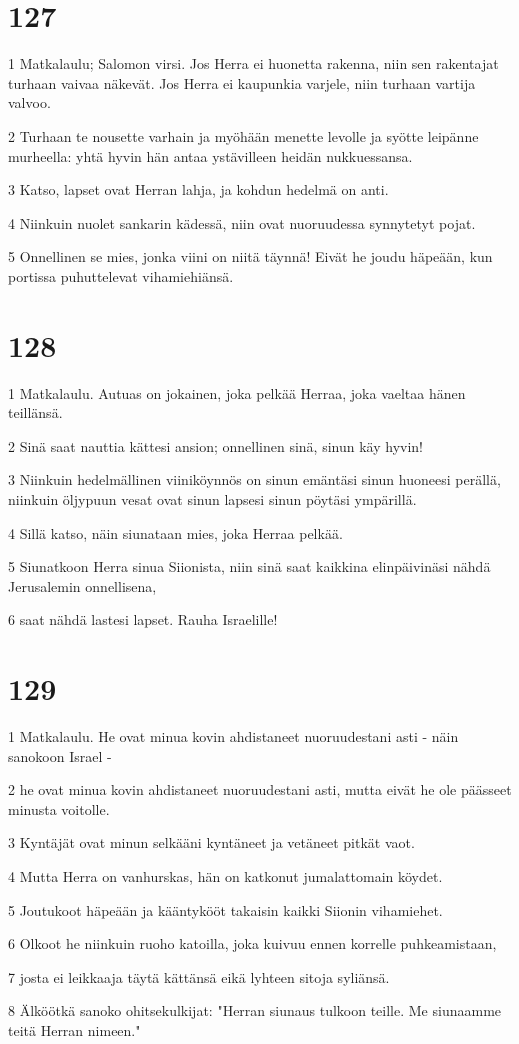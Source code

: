 \chapter{127}

\par 1 Matkalaulu; Salomon virsi. Jos Herra ei huonetta rakenna, niin sen rakentajat turhaan vaivaa näkevät. Jos Herra ei kaupunkia varjele, niin turhaan vartija valvoo.
\par 2 Turhaan te nousette varhain ja myöhään menette levolle ja syötte leipänne murheella: yhtä hyvin hän antaa ystävilleen heidän nukkuessansa.
\par 3 Katso, lapset ovat Herran lahja, ja kohdun hedelmä on anti.
\par 4 Niinkuin nuolet sankarin kädessä, niin ovat nuoruudessa synnytetyt pojat.
\par 5 Onnellinen se mies, jonka viini on niitä täynnä! Eivät he joudu häpeään, kun portissa puhuttelevat vihamiehiänsä.

\chapter{128}

\par 1 Matkalaulu. Autuas on jokainen, joka pelkää Herraa, joka vaeltaa hänen teillänsä.
\par 2 Sinä saat nauttia kättesi ansion; onnellinen sinä, sinun käy hyvin!
\par 3 Niinkuin hedelmällinen viiniköynnös on sinun emäntäsi sinun huoneesi perällä, niinkuin öljypuun vesat ovat sinun lapsesi sinun pöytäsi ympärillä.
\par 4 Sillä katso, näin siunataan mies, joka Herraa pelkää.
\par 5 Siunatkoon Herra sinua Siionista, niin sinä saat kaikkina elinpäivinäsi nähdä Jerusalemin onnellisena,
\par 6 saat nähdä lastesi lapset. Rauha Israelille!

\chapter{129}

\par 1 Matkalaulu. He ovat minua kovin ahdistaneet nuoruudestani asti - näin sanokoon Israel -
\par 2 he ovat minua kovin ahdistaneet nuoruudestani asti, mutta eivät he ole päässeet minusta voitolle.
\par 3 Kyntäjät ovat minun selkääni kyntäneet ja vetäneet pitkät vaot.
\par 4 Mutta Herra on vanhurskas, hän on katkonut jumalattomain köydet.
\par 5 Joutukoot häpeään ja kääntykööt takaisin kaikki Siionin vihamiehet.
\par 6 Olkoot he niinkuin ruoho katoilla, joka kuivuu ennen korrelle puhkeamistaan,
\par 7 josta ei leikkaaja täytä kättänsä eikä lyhteen sitoja syliänsä.
\par 8 Älköötkä sanoko ohitsekulkijat: "Herran siunaus tulkoon teille. Me siunaamme teitä Herran nimeen."

